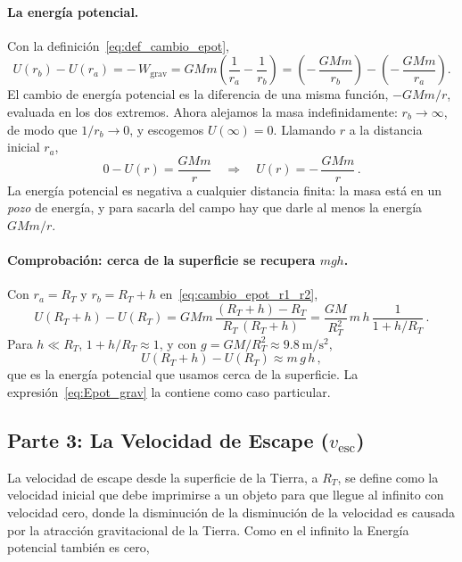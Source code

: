 \documentclass[11pt,a4paper]{book}
\begin{document}
\paragraph{La energía potencial.}
Con la definición~\eqref{eq:def_cambio_epot},
\begin{equation}
  U(r_{b}) - U(r_{a})
  = -\,W_{\text{grav}}
  = GMm\left(\frac{1}{r_{a}} - \frac{1}{r_{b}}\right)
  = \left(-\,\frac{GMm}{r_{b}}\right) - \left(-\,\frac{GMm}{r_{a}}\right) .
  \label{eq:cambio_epot_r1_r2}
\end{equation}
El cambio de energía potencial es la diferencia de una misma función,
$-GMm/r$, evaluada en los dos extremos. Ahora alejamos la masa
indefinidamente: $r_{b} \to \infty$, de modo que $1/r_{b} \to 0$, y escogemos
$U(\infty) = 0$. Llamando $r$ a la distancia inicial $r_{a}$,
\begin{equation}
  0 - U(r) = \frac{GMm}{r}
  \quad\Longrightarrow\quad
  \boxed{U(r) = -\,\frac{GMm}{r}} \,.
  \label{eq:Epot_grav}
\end{equation}
La energía potencial es negativa a cualquier distancia finita: la masa está en
un \emph{pozo} de energía, y para sacarla del campo hay que darle al menos la
energía $GMm/r$.

\paragraph{Comprobación: cerca de la superficie se recupera $mgh$.}
Con $r_{a} = R_{T}$ y $r_{b} = R_{T} + h$ en~\eqref{eq:cambio_epot_r1_r2},
\begin{equation}
  U(R_{T} + h) - U(R_{T})
  = GMm\,\frac{(R_{T} + h) - R_{T}}{R_{T}\,(R_{T} + h)}
  = \frac{GM}{R_{T}^{2}}\,m\,h\,\frac{1}{1 + h/R_{T}} \,.
  \label{eq:epot_cerca_exacta}
\end{equation}
Para $h \ll R_{T}$, $1 + h/R_{T} \approx 1$, y con
$g = GM/R_{T}^{2} \approx \SI{9.8}{\meter\per\second\squared}$,
\begin{equation}
  U(R_{T} + h) - U(R_{T}) \approx m\,g\,h \,,
  \label{eq:epot_cerca_mgh}
\end{equation}
que es la energía potencial que usamos cerca de la superficie. La
expresión~\eqref{eq:Epot_grav} la contiene como caso particular.



\subsection*{Parte 3: La Velocidad de Escape ($v_{\text{esc}}$)}
La velocidad de escape desde la superficie de la Tierra, a $R_T$, se define como la velocidad inicial que debe imprimirse a un objeto para que llegue al infinito con velocidad cero, donde la disminución de la disminución de la velocidad es causada por la atracción gravitacional de la Tierra. Como en el infinito la Energía potencial también es cero,
\end{document}
